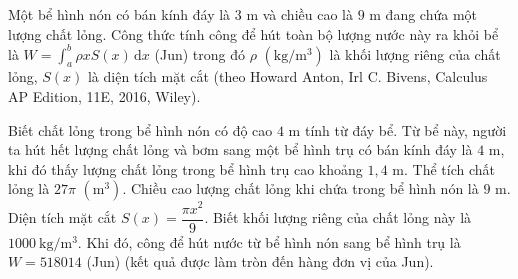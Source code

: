 \begin{ex}
Một bể hình nón có bán kính đáy là $3$ m và chiều cao là $9$ m đang chứa một lượng chất lỏng. Công thức tính công để hút toàn bộ lượng nước này ra khỏi bể là $W=\displaystyle\int_a^b\rho xS(x)\,\mathrm dx$ (Jun) trong đó $\rho$ $(\text{kg}/\text{m}^3)$ là khối lượng riêng của chất lỏng, $S(x)$ là diện tích mặt cắt (theo Howard Anton, Irl C. Bivens, Calculus AP Edition, 11E, 2016, Wiley).
\begin{center}
\end{center}
Biết chất lỏng trong bể hình nón có độ cao $4$ m tính từ đáy bể. Từ bể này, người ta hút hết lượng chất lỏng và bơm sang một bể hình trụ có bán kính đáy là $4$ m, khi đó thấy lượng chất lỏng trong bể hình trụ cao khoảng $1{,}4$ m.
\choiceTF
{Thể tích chất lỏng là $27\pi$ $(\text{m}^3)$.}
{Chiều cao lượng chất lỏng khi chứa trong bể hình nón là $9$ m.}
{\True Diện tích mặt cắt $S(x)=\dfrac{\pi x^2}{9}$.}
{\True Biết khối lượng riêng của chất lỏng này là $1000\ \text{kg}/\text{m}^3$. Khi đó, công để hút nước từ bể hình nón sang bể hình trụ là $W=518014$ (Jun) (kết quả được làm tròn đến hàng đơn vị của Jun).}
\end{ex}
